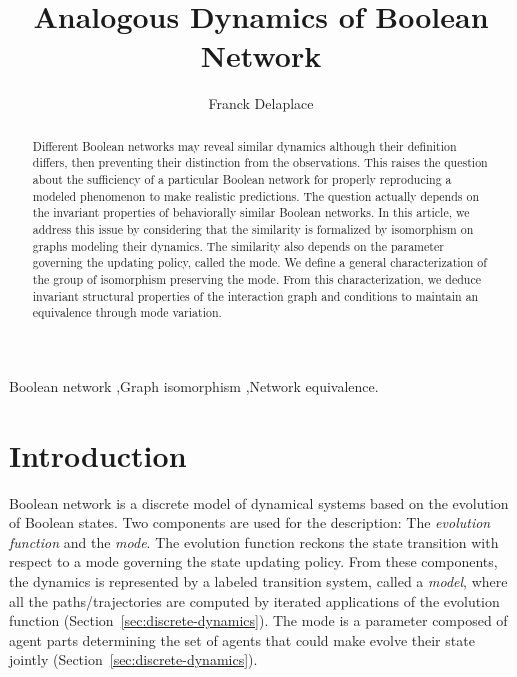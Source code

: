 \documentclass[12pt]{elsarticle}
\begin{document}
\title{Analogous Dynamics of Boolean Network}

\author{Franck Delaplace}
\address{IBISC laboratory, Evry Val d'Essonne University \\ 
 23 boulevard de France 91037 Evry, France}
\begin{abstract}
Different Boolean networks may reveal similar dynamics although their definition differs, then preventing their distinction from the observations. This raises the question about the sufficiency of a particular Boolean network for properly reproducing a modeled phenomenon to make realistic predictions. The question actually depends on the invariant properties of behaviorally similar Boolean networks. In this article, we address this issue by considering that the similarity is formalized by isomorphism on graphs modeling their dynamics. The similarity also depends on the  parameter governing the
updating policy, called the mode. We define a general characterization of the group of isomorphism preserving the mode. From this characterization, we deduce invariant structural properties of the interaction graph and conditions to maintain an equivalence through mode variation.
\end{abstract}
\begin{keyword}
Boolean network \sep Graph isomorphism \sep Network equivalence.
\end{keyword}

\maketitle{}
\section{Introduction}
Boolean network is a discrete model of dynamical systems based on the evolution of Boolean states. Two components are used for the description: The \emph{evolution function} and the \emph{mode}. The evolution function reckons the state transition with respect to a mode governing the state updating policy. From these components, the dynamics is represented by a labeled transition system, called a \emph{model}, where all the paths/trajectories are computed by iterated applications of the evolution function (Section~\ref{sec:discrete-dynamics}). The mode is a parameter composed of  agent parts
determining the set of agents that could make evolve their state jointly (Section~\ref{sec:discrete-dynamics}).
\end{document}
